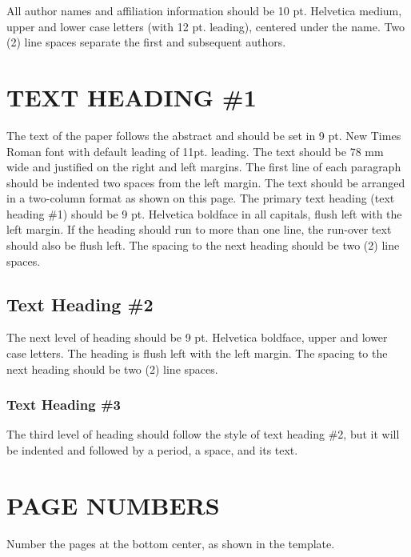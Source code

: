 \documentclass[twocolumn,10pt]{tsfp}
\begin{document}
All author names and affiliation information should be 10 pt. Helvetica medium, upper and lower case letters (with 12 pt. leading), centered under the name. Two (2) line spaces separate the first and subsequent authors.

\section*{TEXT HEADING \#1}

The text of the paper follows the abstract and should be set in 9 pt. New Times Roman font with default leading of 11pt. leading. The text should be 78 mm wide and justified on the right and left margins. The first line of each paragraph should be indented two spaces from the left margin. The text should be arranged in a two-column format as shown on this page. The primary text heading (text heading \#1) should be 9 pt. Helvetica boldface in all capitals, flush left with the left margin. If the heading should run to more than one line, the run-over text should also be flush left. The spacing to the next heading should be two (2) line spaces.

\subsection*{Text Heading \#2}

The next level of heading should be 9 pt. Helvetica boldface, upper and lower case letters. The heading is flush left with the left margin. The spacing to the next heading should be two (2) line spaces.

\subsubsection*{Text Heading \#3}

The third level of heading should follow the style of text heading \#2, but it will be indented and followed by a period, a space, and its text.

\section*{PAGE NUMBERS}

Number the pages at the bottom center, as shown in the template.
\end{document}
